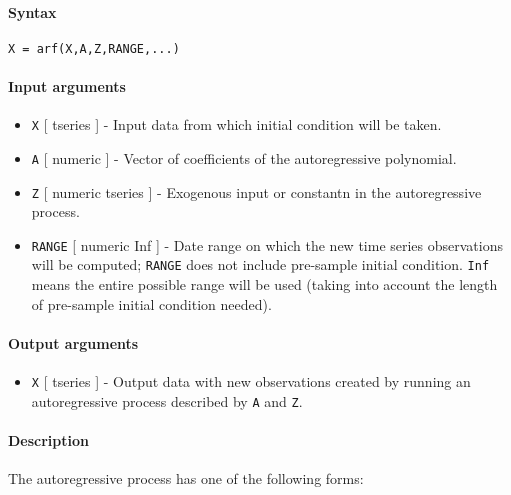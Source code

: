 


	\paragraph{Syntax}

\begin{verbatim}
X = arf(X,A,Z,RANGE,...)
\end{verbatim}

\paragraph{Input arguments}

\begin{itemize}
\item
  \texttt{X} {[} tseries {]} - Input data from which initial condition
  will be taken.
\item
  \texttt{A} {[} numeric {]} - Vector of coefficients of the
  autoregressive polynomial.
\item
  \texttt{Z} {[} numeric \textbar{} tseries {]} - Exogenous input or
  constantn in the autoregressive process.
\item
  \texttt{RANGE} {[} numeric \textbar{} Inf {]} - Date range on which
  the new time series observations will be computed; \texttt{RANGE} does
  not include pre-sample initial condition. \texttt{Inf} means the
  entire possible range will be used (taking into account the length of
  pre-sample initial condition needed).
\end{itemize}

\paragraph{Output arguments}

\begin{itemize}
\itemsep1pt\parskip0pt
\item
  \texttt{X} {[} tseries {]} - Output data with new observations created
  by running an autoregressive process described by \texttt{A} and
  \texttt{Z}.
\end{itemize}

\paragraph{Description}

The autoregressive process has one of the following forms:

